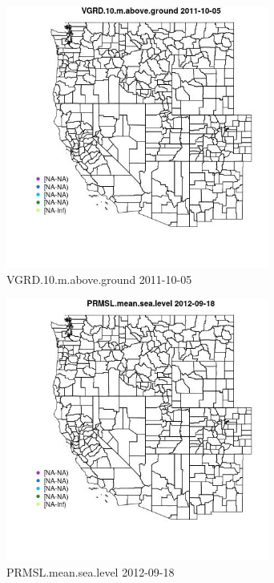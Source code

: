 \begin{figure} 
\centering  
\includegraphics[width=0.77\textwidth]{Code_Outputs/ML_input_report_ML_input_PM25_Step5_part_d_de_duplicated_aves_ML_input_MapObsVGRD10maboveground2011-10-05.jpg} 
\caption{\label{fig:ML_input_report_ML_input_PM25_Step5_part_d_de_duplicated_aves_ML_inputMapObsVGRD10maboveground2011-10-05}VGRD.10.m.above.ground 2011-10-05} 
\end{figure} 
 

\begin{figure} 
\centering  
\includegraphics[width=0.77\textwidth]{Code_Outputs/ML_input_report_ML_input_PM25_Step5_part_d_de_duplicated_aves_ML_input_MapObsPRMSLmeansealevel2012-09-18.jpg} 
\caption{\label{fig:ML_input_report_ML_input_PM25_Step5_part_d_de_duplicated_aves_ML_inputMapObsPRMSLmeansealevel2012-09-18}PRMSL.mean.sea.level 2012-09-18} 
\end{figure} 
 


